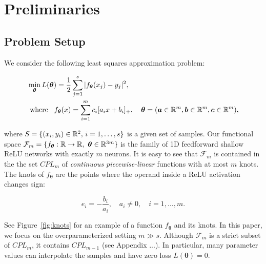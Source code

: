 \section{Preliminaries}







\subsection{Problem Setup}


We consider the following least squares approximation problem:

\begin{equation}\label{eq:leastsquares}
\begin{aligned}
    &\min_{\bm \theta} L(\bm \theta) =  \frac{1}{2} \sum_{j=1}^s |f_{\bm \theta}(x_j) - y_j|^2,\\
    &\mbox{ where } \,\,\, f_{\bm \theta}(x) = \sum_{i=1}^m c_i [a_i x + b_i]_+, \quad \bm \theta = (\bm a \in \mathbb{R}^m, \bm b \in \mathbb{R}^m, \bm c \in \mathbb{R}^m),
\end{aligned}
\end{equation}

where $S = \{ (x_i, y_i) \in \mathbb{R}^2, \, i =1,\ldots, s\}$ is a given set of samples. Our functional space $\mathcal F_m = \{f_{\bm \theta}: \mathbb{R}\rightarrow \mathbb{R}, \, \,\textbf{} {\bm \theta} \in \mathbb{R}^{3m}\}$ is the family of 1D feedforward shallow ReLU networks with exactly $m$ neurons. It is easy to see that $\mathcal F_m$ is contained in the the set $CPL_m$ of \emph{continuous piecewise-linear} functions with at most $m$ knots. The knots of $f_{\bm \theta}$ are the points where the operand inside a ReLU activation changes sign:

\begin{equation}\label{eq:knots}
e_i = -\frac{b_i}{a_i}, \quad a_i \ne 0, \quad i=1,\ldots,m.
\end{equation}

See Figure~\ref{fig:knots} for an example of a function $f_{\bm \theta}$ and its knots. In this paper, we focus on the overparameterized setting $m \gg s$. Although $\mathcal F_m$ is a strict subset of $CPL_m$, it contains $CPL_{m-1}$ (see Appendix ...). In particular, many parameter values can interpolate the samples and have zero loss $L(\bm \theta) = 0$.


